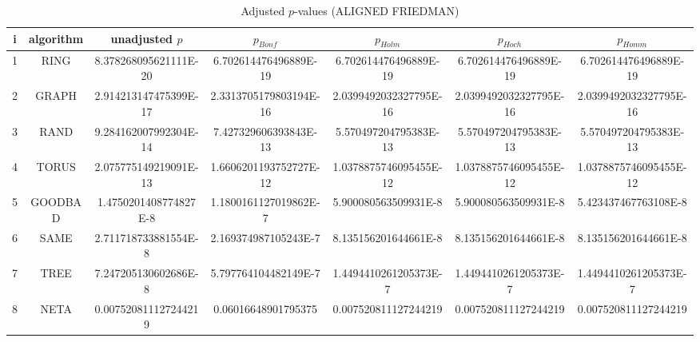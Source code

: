 \documentclass[a4paper,10pt]{article}
\begin{document}
\begin{landscape}
\begin{table}[!htp]
\centering\scriptsize
\caption{Adjusted $p$-values (ALIGNED FRIEDMAN)}
\begin{tabular}{ccccccc}
i&algorithm&unadjusted $p$&$p_{Bonf}$&$p_{Holm}$&$p_{Hoch}$&$p_{Homm}$\\
\hline
1& RING&8.378268095621111E-20&6.702614476496889E-19&6.702614476496889E-19&6.702614476496889E-19&6.702614476496889E-19\\
2& GRAPH&2.914213147475399E-17&2.3313705179803194E-16&2.0399492032327795E-16&2.0399492032327795E-16&2.0399492032327795E-16\\
3& RAND&9.284162007992304E-14&7.427329606393843E-13&5.570497204795383E-13&5.570497204795383E-13&5.570497204795383E-13\\
4& TORUS&2.075775149219091E-13&1.6606201193752727E-12&1.0378875746095455E-12&1.0378875746095455E-12&1.0378875746095455E-12\\
5& GOODBAD&1.4750201408774827E-8&1.1800161127019862E-7&5.900080563509931E-8&5.900080563509931E-8&5.423437467763108E-8\\
6& SAME&2.711718733881554E-8&2.169374987105243E-7&8.135156201644661E-8&8.135156201644661E-8&8.135156201644661E-8\\
7& TREE&7.247205130602686E-8&5.797764104482149E-7&1.4494410261205373E-7&1.4494410261205373E-7&1.4494410261205373E-7\\
8& NETA&0.007520811127244219&0.06016648901795375&0.007520811127244219&0.007520811127244219&0.007520811127244219\\
\hline
\end{tabular}
\end{table}


\end{landscape}
\end{document}
